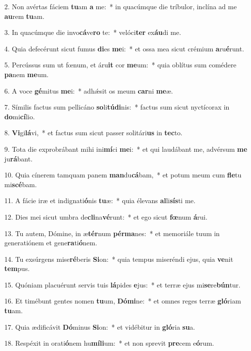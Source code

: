 2. Non avértas fáciem \textbf{tu}am \textbf{a} me:~*  in quacúmque die tríbulor, inclína ad me \textbf{au}rem \textbf{tu}am.\

3. In quacúmque die invo\textbf{cá}ve\textbf{ro} te:~*  velóci\textbf{ter} ex\textbf{áu}di me.\

4. Quia defecérunt sicut fumus \textbf{di}es \textbf{me}i:~*  et ossa mea sicut crémium \textbf{a}ru\textbf{é}runt.\

5. Percússus sum ut fœnum, et áru\textbf{it} cor \textbf{me}um:~*  quia oblítus sum comédere \textbf{pa}nem \textbf{me}um.\

6. A voce \textbf{gé}mitus \textbf{me}i:~*  adhǽsit os meum \textbf{car}ni \textbf{me}æ.\

7. Símilis factus sum pellicáno \textbf{so}li\textbf{tú}\textbf{di}nis:~*  factus sum sicut nyctícorax in \textbf{do}mi\textbf{cí}lio.\

8. \textbf{Vi}gi\textbf{lá}vi,~*  et factus sum sicut passer solitári\textbf{us} in \textbf{tec}to.\

9. Tota die exprobrábant mihi ini\textbf{mí}ci \textbf{me}i:~*  et qui laudábant me, advérsum \textbf{me} ju\textbf{rá}bant.\

10. Quia cínerem tamquam panem \textbf{man}du\textbf{cá}bam,~*  et potum meum cum \textbf{fle}tu mi\textbf{scé}bam.\

11. A fácie iræ et indignati\textbf{ó}nis \textbf{tu}æ:~*  quia élevans \textbf{al}li\textbf{sís}ti me.\

12. Dies mei sicut umbra de\textbf{cli}na\textbf{vé}runt:~*  et ego sicut \textbf{fœ}num \textbf{á}rui.\

13. Tu autem, Dómine, in æ\textbf{tér}num \textbf{pér}\textbf{ma}nes:~*  et memoriále tuum in generatiónem et gene\textbf{ra}ti\textbf{ó}nem.\

14. Tu exsúrgens mise\textbf{ré}beris \textbf{Si}on:~*  quia tempus miseréndi ejus, quia \textbf{ve}nit \textbf{tem}pus.\

15. Quóniam placuérunt servis tuis \textbf{lá}pides \textbf{e}jus:~*  et terræ ejus mi\textbf{se}re\textbf{bún}tur.\

16. Et timébunt gentes nomen \textbf{tu}um, \textbf{Dó}\textbf{mi}ne:~*  et omnes reges terræ \textbf{gló}riam \textbf{tu}am.\

17. Quia ædificávit \textbf{Dó}minus \textbf{Si}on:~*  et vidébitur in \textbf{gló}ria \textbf{su}a.\

18. Respéxit in orati\textbf{ó}nem hu\textbf{mí}\textbf{li}um:~*  et non sprevit \textbf{pre}cem e\textbf{ó}rum.\


